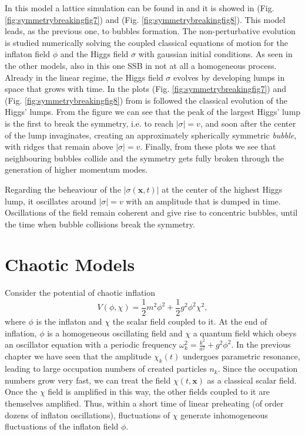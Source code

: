 \documentclass[11pt,a4paper,twoside]{book}
\begin{document}
In this model a lattice simulation can be found in \cite{Chap5:FalseVacuumDecay} and it is showed in (Fig. \ref{fig:symmetrybreakingfig7}) and (Fig. \ref{fig:symmetrybreakingfig8}).  This model leads, as the previous one, to bubbles formation. The non-perturbative evolution is studied numerically solving the coupled classical equations of motion for the inflaton field $\phi$ and the Higgs field $\sigma$ with gaussian initial conditions. 
As seen in the other models, also in this one SSB in not at all a homogeneous process. Already in the linear regime, the Higgs field $\sigma$ evolves by developing lumps in space that grows with time. In the plots (Fig. \ref{fig:symmetrybreakingfig7})  and (Fig. \ref{fig:symmetrybreakingfig8}) from \cite{Chap5:FalseVacuumDecay} is followed the classical evolution of the Higgs' lumps. From the figure we can see that the peak of the largest  Higgs' lump is the first to break the symmetry, i.e. to reach $ |\sigma|=v $, and soon after the center of the lump invaginates, creating an approximately spherically symmetric \textit{bubble}, with ridges that remain above $ |\sigma|=v $. Finally, from these plots we see that neighbouring bubbles collide and the symmetry gets fully broken through the generation of higher momentum modes.

Regarding the beheaviour of the $ |\sigma(\textbf{x},t)| $ at the center of the highest Higgs lump, it oscillates around $ |\sigma|=v $ with an amplitude that is dumped in time. Oscillations of the field remain coherent and give rise to concentric bubbles, until the time when bubble collisions break the symmetry.

\section{Chaotic Models}
Consider the potential of chaotic inflation
\begin{equation}
\label{Chap5:ChaoticModel_potential}
V(\phi,	\chi)= \frac{1}{2}m^{2}\phi^{2} + \frac{1}{2}g^{2}\phi^{2}\chi^{2},
\end{equation}
where $\phi$ is the inflaton and $\chi$ the scalar field coupled to it. At the end of inflation, $\phi$ is a homogeneous oscillating field and $\chi$ a quantum field which obeys an oscillator equation with a periodic frequency $ \omega_{k}^{2}=\frac{k^{2}}{a^{2}} + g^{2}\phi^{2} $. In the previous chapter we have seen that the amplitude $\chi_{k}(t)$ undergoes parametric resonance, leading to large occupation numbers of created particles $ n_{k} $. Since the occupation numbers grow very fast, we can treat the field $\chi(t,\textbf{x})$ as a classical scalar field. Once the $\chi$ field is amplified in this way, the other fields coupled to it are themselves amplified. Thus, within a short time of linear preheating (of order dozens of inflaton oscillations), fluctuations of $\chi$ generate inhomogeneous fluctuations of the inflaton field $\phi$.
\end{document}
